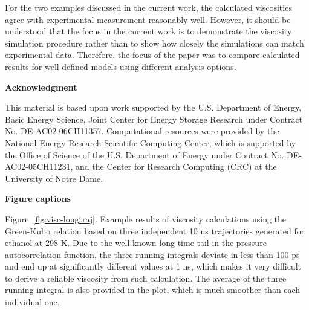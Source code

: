 \documentclass[12pt]{article}
\begin{document}
For the two examples discussed in the current work,
the calculated viscosities agree with experimental measurement reasonably well.
However, it should be understood that the focus in the current work is to demonstrate the viscosity simulation procedure
rather than to show how closely the simulations can match experimental data. 
Therefore, the focus of the paper was to compare calculated results for well-defined models using different analysis options.


\vspace{7 mm}
{\bf\Large Acknowledgment}

This material is based upon work supported by
the U.S. Department of Energy, Basic Energy Science, Joint Center for Energy Storage Research under Contract No. DE-AC02-06CH11357. 
Computational resources were provided by the National Energy Research Scientific Computing Center,
which is supported by the Office of Science of the U.S. Department of Energy under Contract No. DE-AC02-05CH11231,
and the Center for Research Computing (CRC) at the University of Notre Dame.


\newpage
\clearpage


%
%
%






\newpage
\clearpage
{\bf\Large Figure captions}
\vspace{7 mm}

Figure~\ref{fig:visc-longtraj}.
Example results of viscosity calculations using the Green-Kubo relation 
based on three independent 10 ns trajectories generated for ethanol at 298 K.
Due to the well known long time tail in the pressure autocorrelation function,
the three running integrals deviate in less than 100 ps and end up at significantly different values at 1 ns,
which makes it very difficult to derive a reliable viscosity from such calculation.
The average of the three running integral is also provided in the plot, 
which is much smoother than each individual one.
\end{document}
